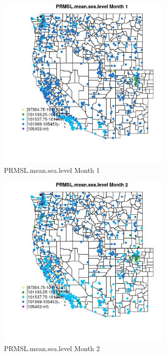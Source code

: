 \begin{figure} 
\centering  
\includegraphics[width=0.77\textwidth]{Code_Outputs/Report_ML_input_PM25_Step4_part_f_de_duplicated_aveswNAs_MapObsMo1PRMSLmeansealevel.jpg} 
\caption{\label{fig:Report_ML_input_PM25_Step4_part_f_de_duplicated_aveswNAsMapObsMo1PRMSLmeansealevel}PRMSL.mean.sea.level Month 1} 
\end{figure} 
 

\clearpage 

\begin{figure} 
\centering  
\includegraphics[width=0.77\textwidth]{Code_Outputs/Report_ML_input_PM25_Step4_part_f_de_duplicated_aveswNAs_MapObsMo2PRMSLmeansealevel.jpg} 
\caption{\label{fig:Report_ML_input_PM25_Step4_part_f_de_duplicated_aveswNAsMapObsMo2PRMSLmeansealevel}PRMSL.mean.sea.level Month 2} 
\end{figure} 
 

